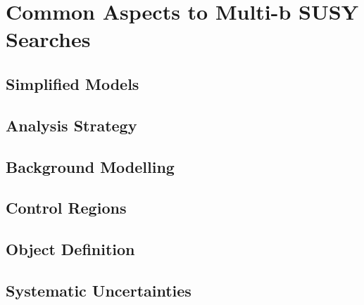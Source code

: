 \chapter{Common Aspects to Multi-b SUSY Searches}
\label{chap:multib_general}

\section{Simplified Models}

\section{Analysis Strategy}

\section{Background Modelling}

\section{Control Regions}

\section{Object Definition}

\section{Systematic Uncertainties}
